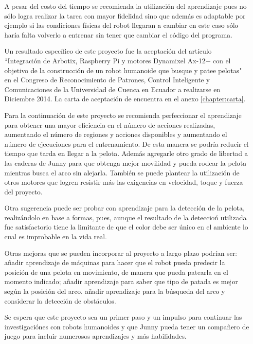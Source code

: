 A pesar del costo del tiempo se recomienda la utilizaci\'on del aprendizaje pues no s\'olo logra realizar la tarea con mayor fidelidad sino que adem\'as es adaptable por ejemplo si las condiciones f\'isicas del robot llegaran a cambiar en este caso s\'olo haría falta volverlo a entrenar sin tener que cambiar el código del programa.

Un resultado espec\'ifico de este proyecto fue la aceptaci\'on del art\'iculo ``Integraci\'on de Arbotix, Raspberry Pi y motores Dynamixel Ax-12+ con el objetivo de la construcción de un robot humanoide que busque y patee pelotas" \cite{junny} en el Congreso de Reconocimiento de Patrones, Control Inteligente y Comunicaciones de la Universidad de Cuenca en Ecuador a realizarse en Diciembre 2014. La carta de aceptaci\'on de encuentra en el anexo \ref{chapter:carta}.

Para la continuaci\'on de este proyecto se recomienda perfeccionar el aprendizaje para obtener una mayor eficiencia en el n\'umero de acciones realizadas, aumentando el número de regiones y acciones disponibles y aumentando el número de ejecuciones para el entrenamiento. De esta manera se podría reducir el tiempo que tarda en llegar a la pelota. Además agregarle otro grado de libertad a las 
caderas de Junny para que obtenga mejor movilidad y pueda rodear la pelota mientras busca el arco sin alejarla. Tambi\'en se puede plantear la utilizaci\'on de otros motores que logren resistir m\'as las exigencias en velocidad, toque y fuerza del proyecto.

Otra sugerencia puede ser probar con aprendizaje para la detecci\'on de la pelota, realiz\'andolo en base a formas, pues, aunque el resultado de la deteccio\'n utilizada fue satisfactorio tiene la limitante de que el color debe ser \'unico en el ambiente lo cual es improbable en la vida real.  

Otras mejoras que se pueden incorporar al proyecto a largo plazo podrían ser: añadir aprendizaje de m\'aquinas para hacer que el robot pueda predecir la posición de una pelota en movimiento, de manera que pueda patearla en el momento indicado; a\~nadir aprendizaje para saber que tipo de patada es mejor seg\'un la posición del arco, a\~nadir aprendizaje para la búsqueda del arco y considerar la detecci\'on de obst\'aculos.

Se espera que este proyecto sea un primer paso y un impulso para continuar las investigaci\'ones con robots humanoides y que Junny pueda tener un compa\~nero de juego para incluir numerosos aprendizajes y m\'as habilidades.

